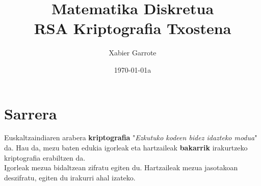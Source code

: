 \documentclass[12pt]{basque-book}
\begin{document}
\title{ \textbf{Matematika Diskretua\\ RSA Kriptografia Txostena} }

\author{Xabier Garrote}

\date{\today a}


\maketitle
\newpage
\tableofcontents
\newpage


\chapter{Sarrera}
Euskaltzaindiaren arabera \textbf{kriptografia} "\textit{Ezkutuko kodeen bidez idazteko modua}" da. Hau da, mezu baten edukia igorleak eta hartzaileak \textbf{bakarrik} irakurtzeko kriptografia erabiltzen da.
\\
Igorleak mezua bidaltzean zifratu egiten du. Hartzaileak mezua jasotakoan deszifratu, egiten du irakurri ahal izateko. 
\\
\end{document}
